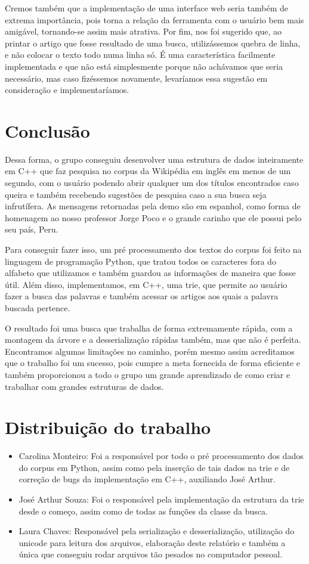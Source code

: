 \documentclass{article}
\begin{document}
Cremos também que a implementação de uma interface web seria também de extrema importância, pois torna a relação da ferramenta com o usuário bem mais amigável, tornando-se assim mais atrativa. Por fim, nos foi sugerido que, ao printar o artigo que fosse resultado de uma busca, utilizássemos quebra de linha, e não colocar o texto todo numa linha só. É uma característica facilmente implementada e que não está simplesmente porque não achávamos que seria necessário, mas caso fizéssemos novamente, levaríamos essa sugestão em consideração e implementaríamos.

\section{Conclusão}

Dessa forma, o grupo conseguiu desenvolver uma estrutura de dados inteiramente em C++ que faz pesquisa no corpus da Wikipédia em inglês em menos de um segundo, com o usuário podendo abrir qualquer um dos títulos encontrados caso queira e também recebendo sugestões de pesquisa caso a sua busca seja infrutífera. As mensagens retornadas pela demo são em espanhol, como forma de homenagem ao nosso professor Jorge Poco e o grande carinho que ele possui pelo seu país, Peru.

Para conseguir fazer isso, um pré processamento dos textos do corpus foi feito na linguagem de programação Python, que tratou todos os caracteres fora do alfabeto que utilizamos e também guardou as informações de maneira que fosse útil. Além disso, implementamos, em C++, uma trie, que permite ao usuário fazer a busca das palavras e também acessar os artigos aos quais a palavra buscada pertence.

O resultado foi uma busca que trabalha de forma extremamente rápida, com a montagem da árvore e a desserialização rápidas também, mas que não é perfeita. Encontramos algumas limitações no caminho, porém mesmo assim acreditamos que o trabalho foi um sucesso, pois cumpre a meta fornecida de forma eficiente e também proporcionou a todo o grupo um grande aprendizado de como criar e trabalhar com grandes estruturas de dados.

\section{Distribuição do trabalho}

\begin{itemize}
    \item Carolina Monteiro: Foi a responsável por todo o pré processamento dos dados do corpus em Python, assim como pela inserção de tais dados na trie e de correção de bugs da implementação em C++, auxiliando José Arthur.
    \item José Arthur Souza: Foi o responsável pela implementação da estrutura da trie desde o começo, assim como de todas as funções da classe da busca.
    \item Laura Chaves: Responsável pela serialização e desserialização, utilização do unicode para leitura dos arquivos, elaboração deste relatório e também a única que conseguiu rodar arquivos tão pesados no computador pessoal.
\end{itemize}
\end{document}
